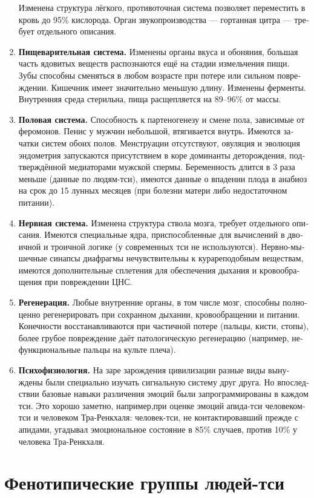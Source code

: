 \documentclass[a4paper,12pt,fleqn]{book}\usepackage{polyglossia}\setdefaultlanguage[babelshorthands=true]{russian}\setotherlanguage{english}\defaultfontfeatures{Ligatures=TeX,Mapping=tex-text}\usepackage{xcolor}\newcommand{\ml}[3]{#2}
\begin{document}
\begin{enumerate}
Изменена структура лёгкого, противоточная система позволяет переместить в кровь до 95\% кислорода.
Орган звукопроизводства --- гортанная цитра --- требует отдельного описания.
\item \textbf{Пищеварительная система.}
Изменены органы вкуса и обоняния, большая часть ядовитых веществ распознаются ещё на стадии измельчения пищи.
Зубы способны сменяться в любом возрасте при потере или сильном повреждении.
Кишечник имеет значительно меньшую длину.
Изменены ферменты.
Внутренняя среда стерильна, пища расщепляется на 89--96\% от массы.
\item \textbf{Половая система.}
Способность к партеногенезу и смене пола, зависимые от феромонов.
Пенис у мужчин небольшой, втягивается внутрь.
Имеются зачатки систем обоих полов.
Менструации отсутствуют, овуляция и эволюция эндометрия запускаются присутствием в коре доминанты деторождения, подтверждённой медиаторами мужской спермы.
Беременность длится в 3 раза меньше (данные по людям-тси), имеются данные о впадении плода в анабиоз на срок до 15 лунных месяцев (при болезни матери либо недостаточном питании).
\item \textbf{Нервная система.}
Изменена структура ствола мозга, требует отдельного описания.
Имеются специальные ядра, приспособленные для вычислений в двоичной и троичной логике (у современных тси не используются).
Нервно-мышечные синапсы диафрагмы нечувствительны к курареподобным веществам, имеются дополнительные сплетения для обеспечения дыхания и кровообращения при повреждении ЦНС.
\item \textbf{Регенерация.} Любые внутренние органы, в том числе мозг, способны полноценно регенерировать при сохранном дыхании, кровообращении и питании.
Конечности восстанавливаются при частичной потере (пальцы, кисти, стопы), более грубое повреждение даёт патологическую регенерацию (например, нефункциональные пальцы на культе плеча).
\item \textbf{Психофизиология.}
На заре зарождения цивилизации разные виды вынуждены были специально изучать сигнальную систему друг друга.
Но впоследствии базовые навыки различения эмоций были запрограммированы в каждом тси.
Это хорошо заметно, например,при оценке эмоций апида-тси человеком-тси и человеком Тра-Ренкхаля: человек-тси, не контактировавший прежде с апидами, угадывал эмоциональное состояние в 85\% случаев, против 10\% у человека Тра-Ренкхаля.
\end{enumerate}

\section{Фенотипические группы людей-тси}
\end{document}
